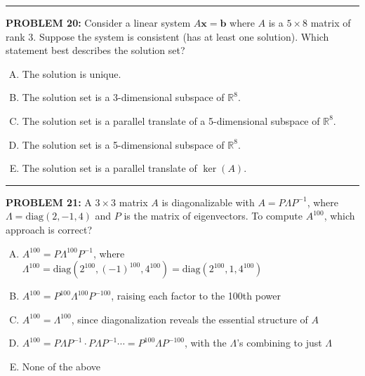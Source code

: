 \documentclass[12pt]{amsart}
\newcommand{\divider}{
  \vspace{-1em} %
  \noindent
  \raisebox{-0.15ex}{\textbullet}%
  \hspace{0.5em}%
  \rule[0.5ex]{0.95\textwidth}{1.0pt}%
  \hspace{0.5em}%
  \raisebox{-0.15ex}{\textbullet}%
  \vspace{0em} %
}
\begin{document}
{\divider

{\bf PROBLEM 20:}
% 
Consider a linear system $A\mathbf{x} = \mathbf{b}$ where $A$ is a $5 \times 8$ matrix of rank $3$. Suppose the system is consistent (has at least one solution). Which statement best describes the solution set?

\begin{enumerate}[(A)]
\item The solution is unique.

\item The solution set is a 3-dimensional subspace of $\mathbb{R}^8$.

\item The solution set is a parallel translate of a 5-dimensional subspace of $\mathbb{R}^8$.

\item The solution set is a 5-dimensional subspace of $\mathbb{R}^8$.

\item The solution set is a parallel translate of $\ker(A)$.
\end{enumerate}


\divider

{\bf PROBLEM 21:}
% 
A $3 \times 3$ matrix $A$ is diagonalizable with $A = P\Lambda P^{-1}$, where $\Lambda  = \text{diag}(2, -1, 4)$ and $P$ is the matrix of eigenvectors.
%
To compute $A^{100}$, which approach is correct?

\begin{enumerate}[(A)]
\item $A^{100} = P\Lambda ^{100}P^{-1}$, where $\Lambda ^{100} = \text{diag}(2^{100}, (-1)^{100}, 4^{100}) = \text{diag}(2^{100}, 1, 4^{100})$
\item $A^{100} = P^{100}\Lambda ^{100}P^{-100}$, raising each factor to the 100th power
\item $A^{100} = \Lambda ^{100}$, since diagonalization reveals the essential structure of $A$
\item $A^{100} = P\Lambda P^{-1} \cdot P\Lambda P^{-1} \cdots = P^{100}\Lambda P^{-100}$, with the $\Lambda $'s combining to just $\Lambda $
\item None of the above
\end{enumerate}

}
\end{document}
